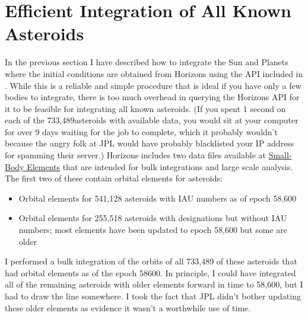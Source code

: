 \section{Efficient Integration of All Known Asteroids}
\label{section_integrate_known_asteroids}
In the previous section I have described how to integrate the Sun and Planets where the initial conditions
are obtained from Horizons using the API included in .
While this is a reliable and simple procedure that is ideal if you have only a few bodies to integrate,
there is too much overhead in querying the Horizons API for it to be feasible for integrating all known asteroids.
(If you spent 1 second on each of the 733,489asteroids with available data, 
you would sit at your computer for over 9 days waiting for the job to complete,
which it probably wouldn't because the angry folk at JPL would have probably blacklisted your IP address
for spamming their server.)
Horizons includes two data files available at \href{https://ssd.jpl.nasa.gov/?sb_elem}{Small-Body Elements}
that are intended for bulk integrations and large scale analysis.
The first two of these contain orbital elements for asteroids:
\begin{itemize}
\item Orbital elements for 541,128 asteroids with IAU numbers as of epoch 58,600
\item Orbital elements for 255,518 asteroids with designations but without IAU numbers; most elements have been updated to epoch 58,600 but some are older
\end{itemize}
I performed a bulk integration of the orbits of all 733,489 of these asteroids that had orbital elements as of the epoch 58600.
In principle, I could have integrated all of the remaining asteroids with older elements forward in time to 58,600, but I had to draw the line somewhere.
I took the fact that JPL didn't bother updating these older elements as evidence it wasn't a worthwhile use of time.

